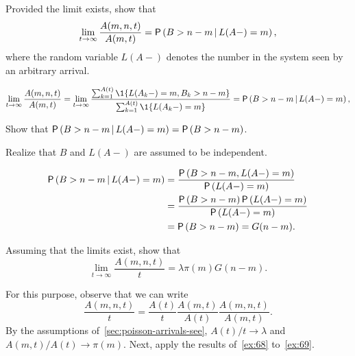 \begin{extra}
Provided the limit exists, show that
\begin{equation}\label{eq:1332}
\lim_{t\to\infty} \frac{A(m,n,t)}{A(m,t)} =\P{B>n-m\given L(A-)=m},
\end{equation}
where the random variable $L(A-)$ denotes the number in the system seen by an arbitrary arrival.
\begin{solution}
\begin{equation*}
\lim_{t\to\infty} \frac{A(m,n,t)}{A(m,t)} = 
\lim_{t\to\infty} \frac{\sum_{k=1}^{A(t)}\1{L(A_k-) = m, B_k > n-m}}
{\sum_{k=1}^{A(t)}\1{L(A_k-) = m}}=\P{B>n-m\given L(A-)=m},
\end{equation*}
\end{solution}
\end{extra}


\begin{extra}
Show that $\P{B>n-m\given L(A-)=m}=\P{B>n-m}$.
\begin{hint}
 Realize that $B$ and $L(A-)$ are assumed to be independent.
\end{hint}
\begin{solution}
\begin{equation*}
 \begin{split}
\P{B>n-m\given L(A-)=m} &=
\frac{\P{B>n-m,L(A-)=m}}{\P{L(A-)=m}}\\
&=\frac{\P{B>n-m}\P{L(A-)=m}}{\P{L(A-)=m}} \\
&= \P{B>n-m} =G(n-m).
 \end{split}
\end{equation*}
\end{solution}
\end{extra}

\begin{exercise}
Assuming that the limits exist, show that
\begin{equation*}
\lim_{t\to\infty} \frac{A(m,n,t)}t = \lambda \pi(m) G(n-m).
\end{equation*}
\begin{solution}
For this purpose, observe that we can write
\begin{equation}\label{eq:16}
 \frac{A(m,n,t)}t = \frac{A(t)}t \frac{A(m,t)}{A(t)}\frac{A(m,n,t)}{A(m,t)}.
\end{equation}
By the assumptions of~\cref{sec:poisson-arrivals-see}, $A(t)/t\to\lambda$ and $A(m,t)/A(t)\to\pi(m)$.
Next, apply the results of~\cref{ex:68} to~\cref{ex:69}.
\end{solution}
\end{exercise}

